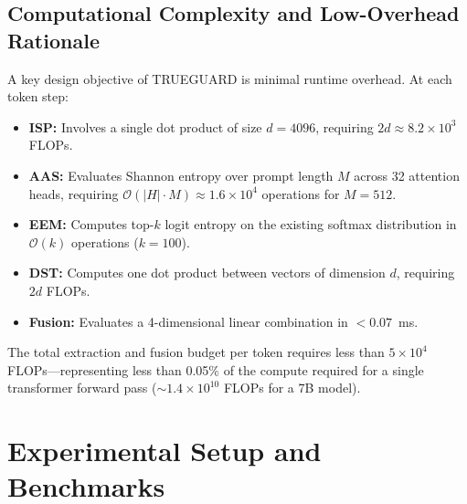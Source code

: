 \documentclass[journal]{IEEEtran}
\begin{document}
\subsection{Computational Complexity and Low-Overhead Rationale}
A key design objective of TRUEGUARD is minimal runtime overhead. At each token step:
\begin{itemize}
    \item \textbf{ISP:} Involves a single dot product of size $d = 4096$, requiring $2d \approx 8.2 \times 10^3$ FLOPs.
    \item \textbf{AAS:} Evaluates Shannon entropy over prompt length $M$ across 32 attention heads, requiring $\mathcal{O}(|H| \cdot M) \approx 1.6 \times 10^4$ operations for $M = 512$.
    \item \textbf{EEM:} Computes top-$k$ logit entropy on the existing softmax distribution in $\mathcal{O}(k)$ operations ($k = 100$).
    \item \textbf{DST:} Computes one dot product between vectors of dimension $d$, requiring $2d$ FLOPs.
    \item \textbf{Fusion:} Evaluates a 4-dimensional linear combination in $<0.07$~ms.
\end{itemize}
The total extraction and fusion budget per token requires less than $5 \times 10^4$ FLOPs---representing less than 0.05\% of the compute required for a single transformer forward pass ($\sim 1.4 \times 10^{10}$ FLOPs for a 7B model).


\section{Experimental Setup and Benchmarks}
\end{document}
